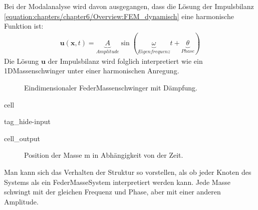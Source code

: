 \documentclass[letterpaper,10pt,german]{jupyterBook}
\let\sphinxpxdimen\pdfpxdimen\else\newdimen\sphinxpxdimen
\begin{document}
\sphinxAtStartPar
Bei der Modalanalyse wird davon ausgegangen, dass die Lösung der Impulsbilanz \eqref{equation:chapters/chapter6/Overview:FEM_dynamisch} eine harmonische Funktion ist:
\begin{equation}\label{equation:chapters/chapter6/Modalanalyse:AnsatzModal}
\begin{split}\bm{u}(\bm{x}, t) = \underbrace{A}_{Amplitude} \sin(\underbrace{\omega}_{Eigenfrequenz} t + \underbrace{\theta}_{Phase} )\end{split}
\end{equation}
\sphinxAtStartPar
Die Lösung \(\bm{u}\) der Impulsbilanz wird folglich interpretiert wie ein 1D\sphinxhyphen{}Massenschwinger unter einer harmonischen Anregung.

\begin{figure}[htbp]
\centering
\capstart

\noindent\sphinxincludegraphics[width=500\sphinxpxdimen]{{spring}.png}
\caption{Eindimensionaler Feder\sphinxhyphen{}Massenschwinger mit Dämpfung.}\label{\detokenize{chapters/chapter6/Modalanalyse:massenschwinger}}\end{figure}

\begin{sphinxuseclass}{cell}
\begin{sphinxuseclass}{tag_hide-input}\begin{sphinxVerbatimOutput}

\begin{sphinxuseclass}{cell_output}
\begin{figure}[htbp]
\centering
\capstart

\noindent{}
\caption{Position der Masse m in Abhängigkeit von der Zeit.}\label{\detokenize{chapters/chapter6/Modalanalyse:harmonischeanregung}}\end{figure}

\end{sphinxuseclass}\end{sphinxVerbatimOutput}

\end{sphinxuseclass}
\end{sphinxuseclass}
\sphinxAtStartPar
Man kann sich das Verhalten der Struktur so vorstellen, als ob jeder Knoten des Systems als ein Feder\sphinxhyphen{}Masse\sphinxhyphen{}System interpretiert werden kann. Jede Masse schwingt mit der gleichen Frequenz und Phase, aber mit einer anderen Amplitude.
\end{document}
